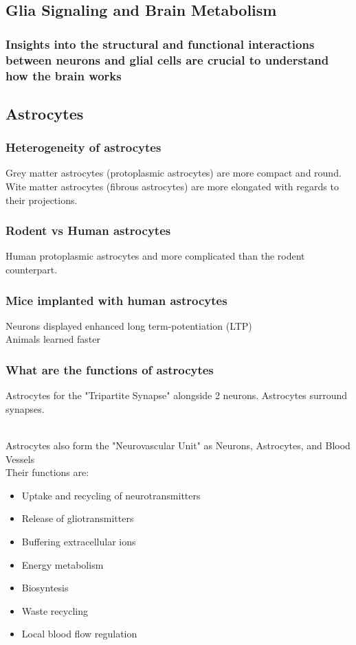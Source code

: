 \begin{itemize}
\begin{itemize}
\section{Glia Signaling and Brain Metabolism}
\subsubsection{Insights into the structural and functional interactions between neurons and glial cells are crucial to understand how the brain works}
\subsection{Astrocytes}
\subsubsection{Heterogeneity of astrocytes}
Grey matter astrocytes (protoplasmic astrocytes) are more compact and round. Wite matter astrocytes (fibrous astrocytes) are more elongated with regards to their projections.
\subsubsection{Rodent vs Human astrocytes}
Human protoplasmic astrocytes and more complicated than the rodent counterpart.
\subsubsection{Mice implanted with human astrocytes}
Neurons displayed enhanced long term-potentiation (LTP)
\\Animals learned faster
\subsubsection{What are the functions of astrocytes}
Astrocytes for the "Tripartite Synapse" alongside 2 neurons. Astrocytes surround synapses.

\\Astrocytes also form the "Neurovascular Unit" as Neurons, Astrocytes, and Blood Vessels
\\Their functions are:
\begin{itemize}
    \item Uptake and recycling of neurotransmitters
    \item Release of gliotransmitters
    \item Buffering extracellular ions 
    \item Energy metabolism
    \item Biosyntesis
    \item Waste recycling
    \item Local blood flow regulation
\end{itemize}


\end{itemize}
\end{itemize}
